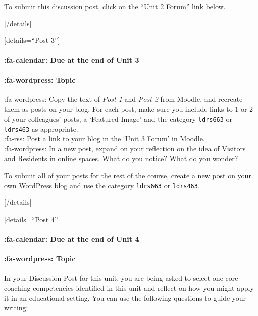 \documentclass[
]{book}
\begin{document}
To submit this discussion post, click on the ``Unit 2 Forum'' link below.

{[}/details{]}

{[}details=``Post 3''{]}

\hypertarget{fa-calendar-due-at-the-end-of-unit-3}{%
\paragraph{:fa-calendar: Due at the end of Unit 3}\label{fa-calendar-due-at-the-end-of-unit-3}}

\hypertarget{fa-wordpress-topic-1}{%
\paragraph{:fa-wordpress: Topic}\label{fa-wordpress-topic-1}}

:fa-wordpress: Copy the text of \emph{Post 1} and \emph{Post 2} from Moodle, and recreate them as posts on your blog. For each post, make sure you include links to 1 or 2 of your colleagues' posts, a `Featured Image' and the category \texttt{ldrs663} or \texttt{ldrs463} as appropriate.\\
:fa-rss: Post a link to your blog in the `Unit 3 Forum' in Moodle.\\
:fa-wordpress: In a new post, expand on your reflection on the idea of Visitors and Residents in online spaces. What do you notice? What do you wonder?

To submit all of your posts for the rest of the course, create a new post on your own WordPress blog and use the category \texttt{ldrs663} or \texttt{ldrs463}.

{[}/details{]}

{[}details=``Post 4''{]}

\hypertarget{fa-calendar-due-at-the-end-of-unit-4}{%
\paragraph{:fa-calendar: Due at the end of Unit 4}\label{fa-calendar-due-at-the-end-of-unit-4}}

\hypertarget{fa-wordpress-topic-2}{%
\paragraph{:fa-wordpress: Topic}\label{fa-wordpress-topic-2}}

In your Discussion Post for this unit, you are being asked to select one core coaching competencies identified in this unit and reflect on how you might apply it in an educational setting. You can use the following questions to guide your writing:
\end{document}
